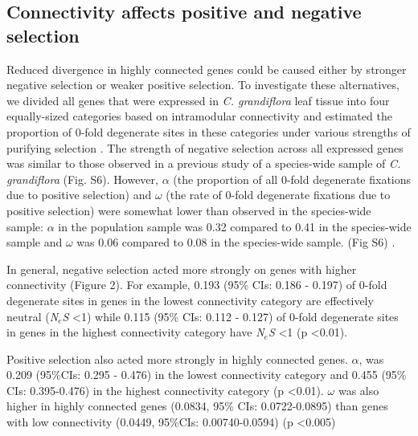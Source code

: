 \subsection{Connectivity affects positive and negative selection}
Reduced divergence in highly connected genes could be caused either by stronger negative selection or weaker positive selection. To investigate these alternatives, we divided all genes that were expressed in \textit{C. grandiflora} leaf tissue into four equally-sized categories based on intramodular connectivity and estimated the proportion of 0-fold degenerate sites in these categories under various strengths of purifying selection \citep{Eyre-Walker2009-zt}.
The strength of negative selection across all expressed genes was similar to those observed in a previous study of a species-wide sample of \textit{C. grandiflora} (Fig. S6). However, $\alpha$ (the proportion of all 0-fold degenerate fixations due to positive selection) and $\omega$ (the rate of 0-fold degenerate fixations due to positive selection) were somewhat lower than observed in the species-wide sample: $\alpha$ in the population sample was 0.32 compared to 0.41 in the species-wide sample and $\omega$ was 0.06 compared to 0.08 in the species-wide sample. (Fig S6) \citep{Williamson2014-tf}.

In general, negative selection acted more strongly on genes with higher connectivity (Figure 2). For example, 0.193 (95\% CIs: 0.186 - 0.197) of 0-fold degenerate sites in genes in the lowest connectivity category are effectively neutral (\textit{N$_{e}$S} \textless 1) while 0.115 (95\% CIs: 0.112 - 0.127) of 0-fold degenerate sites in genes in the highest connectivity category have \textit{N$_{e}$S} \textless 1 (p \textless 0.01). 

Positive selection also acted more strongly in highly connected genes. $\alpha$, was 0.209 (95\%CIs: 0.295 - 0.476) in the lowest connectivity category and 0.455 (95\% CIs: 0.395-0.476) in the highest connectivity category (p \textless 0.01). $\omega$ was also higher in highly connected genes (0.0834, 95\% CIs: 0.0722-0.0895) than genes with low connectivity (0.0449, 95\%CIs: 0.00740-0.0594) (p \textless 0.005)

